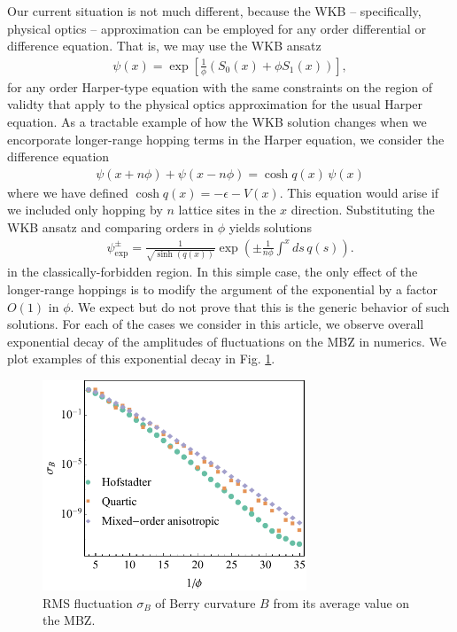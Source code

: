 \documentclass[aps,prb,twocolumn,letterpaper,twoside,nobalancelastpage,groupedaddress,amsmath,amssymb,floatfix,citeautoscript]{revtex4-1}
\begin{document}
Our current situation is not much different, because the WKB -- specifically, physical optics -- approximation can be employed for any order differential or difference equation. That is, we may use the WKB ansatz
\begin{align}
\label{wkb-ansatz}
\psi(x) = \exp\left[\frac{1}{\phi}\left(S_0(x) + \phi S_1(x)\right)\right],
\end{align}
for any order Harper-type equation with the same constraints on the region of validty that apply to the physical optics approximation for the usual Harper equation\cite{bender_advanced_1999}. 
As a tractable example of how the WKB solution changes when we encorporate longer-range hopping terms in the Harper equation, we consider the difference equation
\begin{align*}
\psi(x + n \phi) + \psi(x - n\phi) = \cosh q(x)\,\psi(x)
\end{align*}
where we have defined $\cosh q(x) = -\epsilon - V(x)$.
This equation would arise if we included only hopping by $n$ lattice sites in the $x$ direction.
Substituting the WKB ansatz and comparing orders in $\phi$ yields solutions
\begin{align*}
\psi_{\text{exp}}^{\pm} = \frac{1}{\sqrt{\sinh(q(x))}}\exp\left(\pm \frac{1}{n\phi} \int^x ds\, q(s) \right).
\end{align*}
in the classically-forbidden region. In this simple case, the only effect of the longer-range hoppings is to modify the argument of the exponential by a factor $O(1)$ in $\phi$. We expect but do not prove that this is the generic behavior of such solutions. For each of the cases we consider in this article, we observe overall exponential decay of the amplitudes of fluctuations on the MBZ in numerics. We plot examples of this exponential decay in 
Fig. \ref{rms-curv-fluct-plot}.
\begin{figure}[thb]
\centering
\includegraphics[width=3.1in]{rms-curv-fluct.pdf}
\caption{\label{rms-curv-fluct-plot}RMS fluctuation $\sigma_B$ of Berry curvature $B$ from its average value on the MBZ.}
\end{figure}
\end{document}
